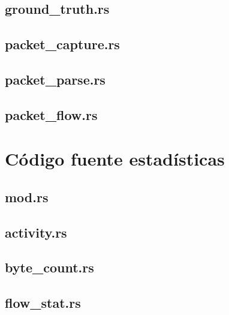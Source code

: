 \documentclass[11pt]{report}
\begin{document}
\section{ground\_truth.rs}


\section{packet\_capture.rs}


\section{packet\_parse.rs}


\section{packet\_flow.rs}


\chapter{Código fuente estadísticas}

\section{mod.rs}


\section{activity.rs}


\section{byte\_count.rs}


\section{flow\_stat.rs}

\end{document}

